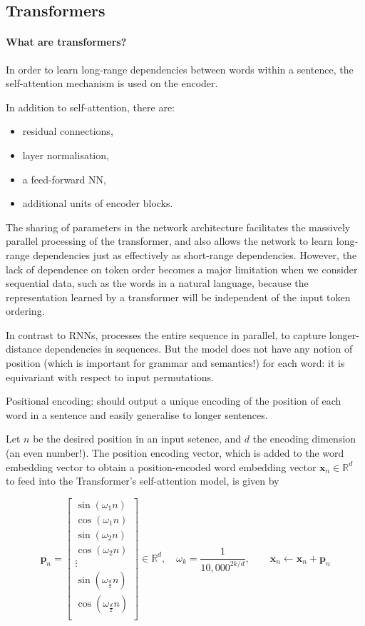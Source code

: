 \newpage
\subsection{Transformers}

\paragraph{What are transformers?}

In order to learn long-range dependencies between words within a sentence,
the self-attention mechanism is used on the encoder.

In addition to self-attention, there are:

\begin{itemize}
    \item residual connections,
    \item layer normalisation,
    \item a feed-forward NN,
    \item additional units of encoder blocks.
\end{itemize}

The sharing of parameters in the network architecture facilitates the massively parallel
processing of the transformer, and also allows the network to learn long-range
dependencies just as effectively as short-range dependencies. However, the lack of
dependence on token order becomes a major limitation when we consider sequential
data, such as the words in a natural language, because the representation learned by
a transformer will be independent of the input token ordering.

In contrast to RNNs, processes the entire sequence in parallel,
to capture longer-distance dependencies in sequences.
But the model does not have any notion of position  (which is important for grammar and semantics!) for each word:
it is equivariant with respect to input permutations.

Positional encoding: should output a unique encoding of the position of each word in a sentence and easily generalise to longer sentences.

Let $n$ be the desired position in an input setence, and $d$ the encoding dimension (an even number!).
The position encoding vector, which is added to the word embedding vector to obtain a position-encoded word embedding vector $\bm{x}_n \in \mathbb{R}^d$ to feed into the Transformer's self-attention model,
is given by

$$
\bm{p}_n = \begin{bmatrix}
    \sin(\omega_1 n) \\
    \cos(\omega_1 n) \\
    \sin(\omega_2 n) \\
    \cos(\omega_2 n) \\
    \vdots \\
    \sin(\omega_{\frac{d}{2}} n) \\
    \cos(\omega_{\frac{d}{2}} n) \\
\end{bmatrix} \in \mathbb{R}^d, \quad
\omega_k = \frac{1}{10,000^{2k / d}}, \qquad
\bm{x}_n \leftarrow \bm{x}_n + \bm{p}_n
$$

